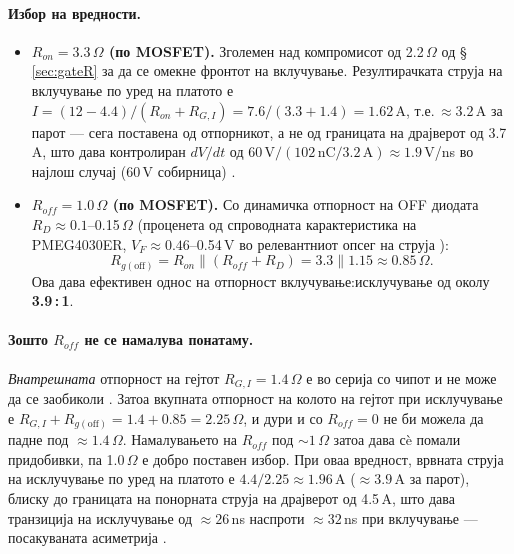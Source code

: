 \documentclass[11pt,a4paper]{article}
\begin{document}
\paragraph{Избор на вредности.}
\begin{itemize}
  \item \textbf{$R_{on} = 3.3\,\Omega$ (по MOSFET).} Зголемен над компромисот од 2.2\,$\Omega$ од \S\,\ref{sec:gateR} за да се омекне фронтот на вклучување. Резултирачката струја на вклучување по уред на платото е $I=(12-4.4)/(R_{on}+R_{G,I})=7.6/(3.3+1.4)=1.62$\,A, т.е.\,$\approx 3.2$\,A за парот --- сега поставена од отпорникот, а не од границата на драјверот од 3.7\,A, што дава контролиран $dV/dt$ од $60\,\mathrm{V}/(102\,\mathrm{nC}/3.2\,\mathrm{A})\approx 1.9$\,V/ns во најлош случај (60\,V собирница) \cite{ref1,ref3}.
  \item \textbf{$R_{off} = 1.0\,\Omega$ (по MOSFET).} Со динамичка отпорност на OFF диодата $R_{D}\approx 0.1$--0.15\,$\Omega$ (проценета од спроводната карактеристика на PMEG4030ER, $V_F\approx 0.46$--0.54\,V во релевантниот опсег на струја \cite{ref12}):
  \begin{equation}
  R_{g(\text{off})} = R_{on} \parallel (R_{off}+R_D) = 3.3 \parallel 1.15 \approx 0.85\,\Omega.
  \end{equation}
  Ова дава ефективен однос на отпорност вклучување:исклучување од околу \textbf{3.9\,:\,1}.
\end{itemize}

\paragraph{Зошто $R_{off}$ не се намалува понатаму.} \emph{Внатрешната} отпорност на гејтот $R_{G,I}=1.4\,\Omega$ е во серија со чипот и не може да се заобиколи \cite{ref1}. Затоа вкупната отпорност на колото на гејтот при исклучување е $R_{G,I}+R_{g(\text{off})}=1.4+0.85=2.25\,\Omega$, и дури и со $R_{off}=0$ не би можела да падне под $\approx 1.4\,\Omega$. Намалувањето на $R_{off}$ под $\sim 1\,\Omega$ затоа дава сè помали придобивки, па 1.0\,$\Omega$ е добро поставен избор. При оваа вредност, врвната струја на исклучување по уред на платото е $4.4/2.25 \approx 1.96$\,A ($\approx 3.9$\,A за парот), блиску до границата на понорната струја на драјверот од 4.5\,A, што дава транзиција на исклучување од $\approx 26$\,ns наспроти $\approx 32$\,ns при вклучување --- посакуваната асиметрија \cite{ref3}.
\end{document}
